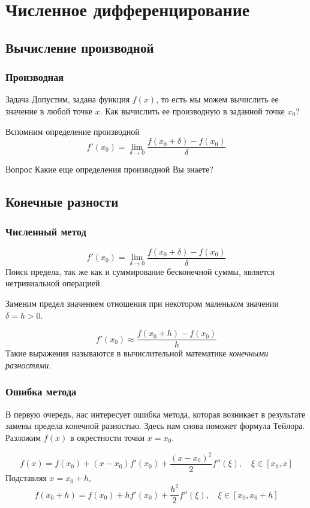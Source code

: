 \documentclass[aspectratio=43,unicode]{beamer}
\begin{document}
\section{Численное дифференцирование}
\subsection{Вычисление производной}
\begin{frame}
\frametitle{Производная}
	\begin{block}{Задача}
	Допустим, задана функция $f(x)$, то есть мы можем вычислить ее значение в любой точке $x$.
	Как вычислить ее производную в заданной точке $x_0$?
	\end{block}
	\pause
	Вспомним определение производной
	\[
	f'(x_0) = \lim_{\delta \rightarrow 0} \frac{f(x_0+\delta) - f(x_0)}{\delta}
	\]
	\begin{block}{Вопрос}
	Какие еще определения производной Вы знаете?
	\end{block}
\end{frame}

\subsection{Конечные разности}
\begin{frame}
\frametitle{Численный метод}
	\[
	f'(x_0) = \lim_{\delta \rightarrow 0} \frac{f(x_0+\delta) - f(x_0)}{\delta}
	\]
	Поиск предела, так же как и суммирование бесконечной суммы, является нетривиальной операцией.

	\pause
	Заменим предел значением отношения при некотором маленьком значении $\delta = h > 0$.

	\[
	f'(x_0) \approx \frac{f(x_0+h) - f(x_0)}{h}
	\]
	Такие выражения называются в вычислительной математике \emph{конечными
	разностями}.
\end{frame}

\begin{frame}
\frametitle{Ошибка метода}
	В первую очередь, нас интересует ошибка метода, которая возникает в результате замены предела
	конечной разностью. Здесь нам снова поможет формула Тейлора. Разложим $f(x)$ в окрестности
	точки $x = x_0$.

	\[
	f(x) = f(x_0) + (x-x_0) f'(x_0) + \frac{(x-x_0)^2}{2} f''(\xi), \quad \xi \in [x_0,x]
	\]
	\pause
	Подставляя $x = x_0 + h$,
	\[
	f(x_0 + h) = f(x_0) + h f'(x_0) + \frac{h^2}{2} f''(\xi), \quad \xi \in [x_0,x_0+h]
	\]
\end{frame}
\end{document}
